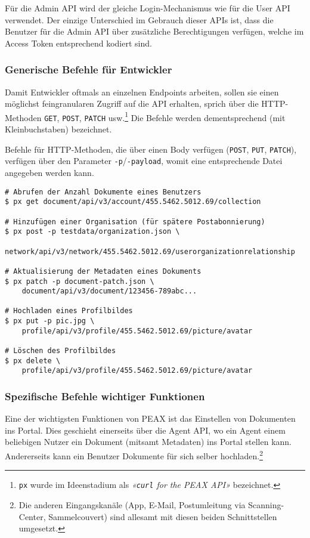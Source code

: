 Für die Admin API wird der gleiche Login-Mechanismus wie für die User API verwendet. Der einzige Unterschied im Gebrauch dieser APIs ist, dass die Benutzer für die Admin API über zusätzliche Berechtigungen verfügen, welche im Access Token entsprechend kodiert sind.

\subsubsection{Generische Befehle für Entwickler}
\label{sec:Generische-Befehle}

Damit Entwickler oftmals an einzelnen Endpoints arbeiten, sollen sie einen möglichst feingranularen Zugriff auf die API erhalten, sprich über die HTTP-Methoden \texttt{GET}, \texttt{POST}, \texttt{PATCH} usw.\footnote{\texttt{px} wurde im Ideenstadium als \textit{«\texttt{curl} for the PEAX API»} bezeichnet.} Die Befehle werden dementsprechend (mit Kleinbuchstaben) bezeichnet.

Befehle für HTTP-Methoden, die über einen Body verfügen (\texttt{POST}, \texttt{PUT}, \texttt{PATCH}), verfügen über den Parameter \texttt{-p}/\texttt{-payload}, womit eine entsprechende Datei angegeben werden kann.

\begin{lstlisting}[caption={Anwendung der feingranularen HTTP-Befehle}]
# Abrufen der Anzahl Dokumente eines Benutzers
$ px get document/api/v3/account/455.5462.5012.69/collection

# Hinzufügen einer Organisation (für spätere Postabonnierung)
$ px post -p testdata/organization.json \
    network/api/v3/network/455.5462.5012.69/userorganizationrelationship

# Aktualisierung der Metadaten eines Dokuments
$ px patch -p document-patch.json \
    document/api/v3/document/123456-789abc...

# Hochladen eines Profilbildes
$ px put -p pic.jpg \
    profile/api/v3/profile/455.5462.5012.69/picture/avatar

# Löschen des Profilbildes
$ px delete \
    profile/api/v3/profile/455.5462.5012.69/picture/avatar
\end{lstlisting}

\subsubsection{Spezifische Befehle wichtiger Funktionen}

Eine der wichtigsten Funktionen von PEAX ist das Einstellen von Dokumenten ins Portal. Dies geschieht einerseits über die Agent API, wo ein Agent einem beliebigen Nutzer ein Dokument (mitsamt Metadaten) ins Portal stellen kann. Andererseits kann ein Benutzer Dokumente für sich selber hochladen.\footnote{Die anderen Eingangskanäle (App, E-Mail, Postumleitung via Scanning-Center, Sammelcouvert) sind allesamt mit diesen beiden Schnittstellen umgesetzt.}

